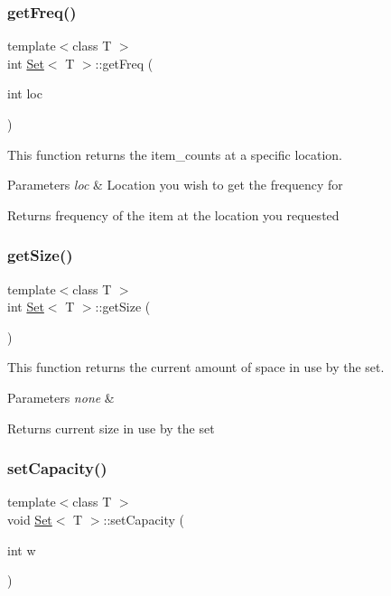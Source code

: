 \subsubsection{\texorpdfstring{get\+Freq()}{getFreq()}}
{\footnotesize\ttfamily template$<$class T $>$ \\
int \hyperlink{class_set}{Set}$<$ T $>$\+::get\+Freq (\begin{DoxyParamCaption}\item[{int}]{loc }\end{DoxyParamCaption})}

This function returns the item\+\_\+counts at a specific location.


\begin{DoxyParams}{Parameters}
{\em loc} & Location you wish to get the frequency for \\
\hline
\end{DoxyParams}
\begin{DoxyReturn}{Returns}
frequency of the item at the location you requested 
\end{DoxyReturn}
\mbox{\label{class_set_a3d2e0df73e2455964840fe5c668f3d81}} 
\subsubsection{\texorpdfstring{get\+Size()}{getSize()}}
{\footnotesize\ttfamily template$<$class T $>$ \\
int \hyperlink{class_set}{Set}$<$ T $>$\+::get\+Size (\begin{DoxyParamCaption}{ }\end{DoxyParamCaption})}

This function returns the current amount of space in use by the set.


\begin{DoxyParams}{Parameters}
{\em none} & \\
\hline
\end{DoxyParams}
\begin{DoxyReturn}{Returns}
current size in use by the set 
\end{DoxyReturn}
\mbox{\label{class_set_a94e652a0e9f9922c79762adb6eaf86c1}} 
\subsubsection{\texorpdfstring{set\+Capacity()}{setCapacity()}}
{\footnotesize\ttfamily template$<$class T $>$ \\
void \hyperlink{class_set}{Set}$<$ T $>$\+::set\+Capacity (\begin{DoxyParamCaption}\item[{int}]{w }\end{DoxyParamCaption})}

